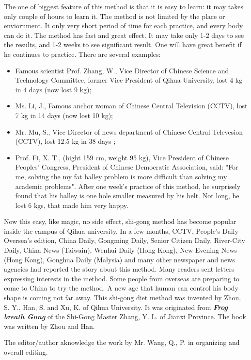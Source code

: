 The one of biggest feature of this method is that it is easy to learn: it may takes only couple of hours to learn it.
The method is not limited by the place or enviornment. It only very short period of time for each practice, and
every body can do it. The method has fast and great effect. It may take only 1-2 days to see the results, and
1-2 weeks to see significant result. One will have great benefit if he continues to practice. There are several
examples:
\begin{itemize}
\item Famous scientist Prof. Zhang, W., Vice Director of Chinese Science and Technology Committee,
former Vice President of Qihua University, lost 4 kg in 4 days (now lost 9 kg); 
\item Ms. Li, J., Famous anchor woman of Chinese Central Television (CCTV), lost 7 kg in 14 days (now lost 10 kg);
\item Mr. Mu, S., Vice Director of news department of Chinese Central Televesion (CCTV), lost 12.5 kg in 38 days ;
\item Prof. Fi, X. T., (hight 159 cm, weight 95 kg), Vice President of Chinese Peoples' Congress,
President of Chinese Democratic Association, said: "For me, solving the my fat balley problem is more difficult than
solving my academic problems". After one week's practice of this method, he surprisely found that his balley is
one hole smaller measured by his belt. Not long, he lost 6 kgs, that made him very happy.  
\end{itemize}

Now this easy, like magic, no side effect, shi-gong method has become popular inside the campus of Qihua university.
In a few months, CCTV, People's Daily Oversea's edition, China Daily, Gongming Daily, Senior Citizen Daily, River-City
Daily, China News (Taiwain), Wenhui Daily (Hong Kong), New Evening News (Hong Kong), Gonghua Daily (Malysia) and many
other newspaper and news agencies had reported the story about this method. Many readers sent letters expressing 
interests in the method. Some people from overseas are preparing to come to China to try the method. A new age that
human can control his body shape is coming not far away. This shi-gong diet method was invented by Zhou, S. Y.,
Han, S. and Xu, K. of Qihua University. It was originated from {\bf\em Frog breath Gong} of the Shi-Gong Master
Zhang, Y. L. of Jianxi Province. The book was written by Zhou and Han.  

\vspace {0.15 in}
The editor/author aknowledge the work by Mr. Wang, Q., P. in organizing and overall editing.

